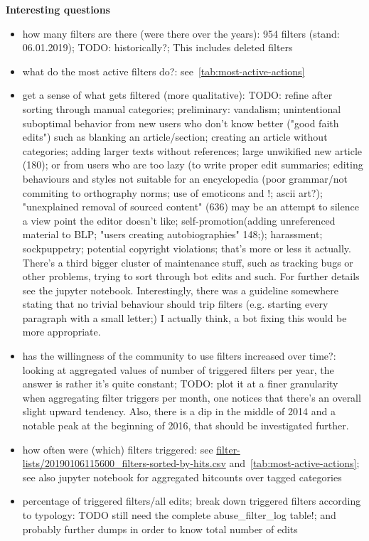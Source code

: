 \textbf{Interesting questions}
\begin{itemize}
    \item how many filters are there (were there over the years): 954 filters (stand: 06.01.2019); TODO: historically?; This includes deleted filters
    \item what do the most active filters do?: see~\ref{tab:most-active-actions}
    \item get a sense of what gets filtered (more qualitative): TODO: refine after sorting through manual categories; preliminary: vandalism; unintentional suboptimal behavior from new users who don't know better ("good faith edits") such as blanking an article/section; creating an article without categories; adding larger texts without references; large unwikified new article (180); or from users who are too lazy (to write proper edit summaries; editing behaviours and styles not suitable for an encyclopedia (poor grammar/not commiting to orthography norms; use of emoticons and !; ascii art?); "unexplained removal of sourced content" (636) may be an attempt to silence a view point the editor doesn't like; self-promotion(adding unreferenced material to BLP; "users creating autobiographies" 148;); harassment; sockpuppetry; potential copyright violations; that's more or less it actually. There's a third bigger cluster of maintenance stuff, such as tracking bugs or other problems, trying to sort through bot edits and such. For further details see the jupyter notebook.
        Interestingly, there was a guideline somewhere stating that no trivial behaviour should trip filters (e.g. starting every paragraph with a small letter;) I actually think, a bot fixing this would be more appropriate.
    \item has the willingness of the community to use filters increased over time?: looking at aggregated values of number of triggered filters per year, the answer is rather it's quite constant; TODO: plot it at a finer granularity
        when aggregating filter triggers per month, one notices that there's an overall slight upward tendency.
        Also, there is a dip in the middle of 2014 and a notable peak at the beginning of 2016, that should be investigated further.
    \item how often were (which) filters triggered: see \url{filter-lists/20190106115600_filters-sorted-by-hits.csv} and~\ref{tab:most-active-actions}; see also jupyter notebook for aggregated hitcounts over tagged categories
    \item percentage of triggered filters/all edits; break down triggered filters according to typology: TODO still need the complete abuse\_filter\_log table!; and probably further dumps in order to know total number of edits

\end{itemize}
